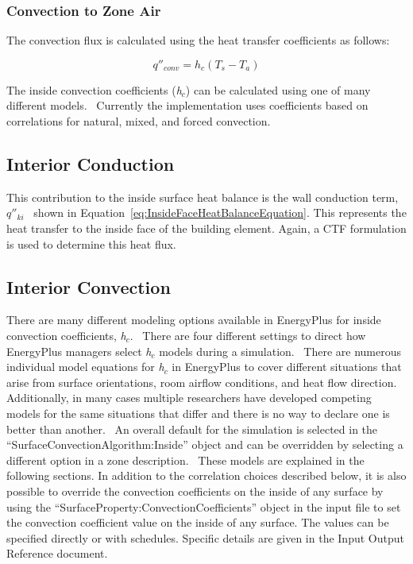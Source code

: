 \subsubsection{Convection to Zone Air}\label{convection-to-zone-air}

The convection flux is calculated using the heat transfer coefficients as follows:

\begin{equation}
{q''_{conv}} = {h_c}({T_s} - {T_a})
\end{equation}

The inside convection coefficients (\emph{h\(_{c}\)}) can be calculated using one of many different models.~ Currently the implementation uses coefficients based on correlations for natural, mixed, and forced convection.

\subsection{Interior Conduction}\label{interior-conduction}

This contribution to the inside surface heat balance is the wall conduction term, \({q''_{ki}}\) ~shown in Equation~\ref{eq:InsideFaceHeatBalanceEquation}. This represents the heat transfer to the inside face of the building element. Again, a CTF formulation is used to determine this heat flux.

\subsection{Interior Convection}\label{interior-convection}

There are many different modeling options available in EnergyPlus for inside convection coefficients, \emph{h\(_{c}\)}.~ There are four different settings to direct how EnergyPlus managers select \emph{h\(_{c}\)} models during a simulation.~ There are numerous individual model equations for \emph{h\(_{c}\)} in EnergyPlus to cover different situations that arise from surface orientations, room airflow conditions, and heat flow direction.~ Additionally, in many cases multiple researchers have developed competing models for the same situations that differ and there is no way to declare one is better than another.~ An overall default for the simulation is selected in the ``SurfaceConvectionAlgorithm:Inside'' object and can be overridden by selecting a different option in a zone description.~ These models are explained in the following sections. In addition to the correlation choices described below, it is also possible to override the convection coefficients on the inside of any surface by using the ``SurfaceProperty:ConvectionCoefficients'' object in the input file to set the convection coefficient value on the inside of any surface. The values can be specified directly or with schedules. Specific details are given in the Input Output Reference document.

